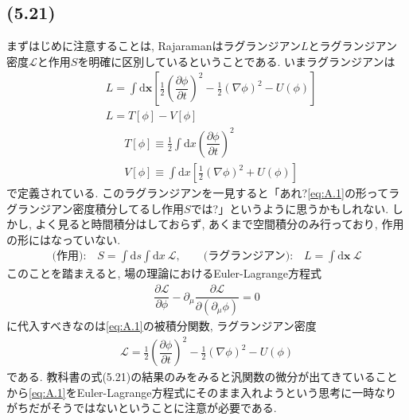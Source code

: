 \documentclass[dvipdfmx,11pt,a4paper,oneside,openany]{jsbook}
\begin{document}
\subsection{(5.21)}
まずはじめに注意することは, Rajaramanはラグランジアン$L$とラグランジアン密度$\mathcal{L}$と作用$S$を明確に区別しているということである. いまラグランジアンは
\setcounter{equation}{18}
\begin{align}
     & L  =\int \mathrm{d}\bm{x}\left[\frac{1}{2}\left(\dfrac{\partial\phi}{\partial t}\right)^2-\frac{1}{2}(\nabla\phi)^2-U(\phi)\right]\tag{A.1}\label{eq:A.1} \\
     & L  =T[\phi]-V[\phi]
\end{align}
\vspace{-11mm}
\begin{subequations}
    \begin{align}
         & T[\phi]\equiv\frac{1}{2}\int\mathrm{d}x\left(\dfrac{\partial\phi}{\partial t}\right)^2      \\
         & V[\phi]\equiv\int\mathrm{d}x\left[\frac{1}{2}(\nabla \phi)^2+U(\phi)\right]\label{eq:5.20b}
    \end{align}
\end{subequations}
で定義されている. このラグランジアンを一見すると「あれ?\eqref{eq:A.1}の形ってラグランジアン密度積分してるし作用$S$では?」というように思うかもしれない. しかし, よく見ると時間積分はしておらず, あくまで空間積分のみ行っており, 作用の形にはなっていない.
\begin{align*}
    \text{(作用):}\quad S=\int \mathrm{d}s \int\mathrm{d}x~ \mathcal{L},\qquad \text{(ラグランジアン):}\quad L=\int\mathrm{d}\bm{x}~\mathcal{L}
\end{align*}
このことを踏まえると, 場の理論におけるEuler-Lagrange方程式
\begin{align*}
    \dfrac{\partial \mathcal{L}}{\partial \phi}-\partial_{\mu}\dfrac{\partial \mathcal{L}}{\partial(\partial_\mu \phi)}=0
\end{align*}
に代入すべきなのは\eqref{eq:A.1}の被積分関数, ラグランジアン密度
\begin{align*}
    \mathcal{L}=\frac{1}{2}\left(\dfrac{\partial\phi}{\partial t}\right)^2-\frac{1}{2}(\nabla\phi)^2-U(\phi)
\end{align*}
である. 教科書の式(5.21)の結果のみをみると汎関数の微分が出てきていることから\eqref{eq:A.1}をEuler-Lagrange方程式にそのまま入れようという思考に一時なりがちだがそうではないということに注意が必要である.
\end{document}
